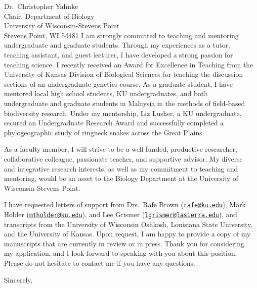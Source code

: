\documentclass[letterpaper, 10pt]{letter}
\begin{document}
\begin{letter}{Dr.\ Christopher Yahnke \\
                     Chair, Department of Biology \\
                     University of Wisconsin-Stevens Point \\
                     Stevens Point, WI  54481}
I am strongly committed to teaching and mentoring undergraduate and graduate students.
Through my experiences as a tutor, teaching assistant, and guest lecturer, I have developed a strong passion for teaching science.
I recently received an Award for Excellence in Teaching from the University of Kansas Division of Biological Sciences for teaching the discussion sections of an undergraduate genetics course.
As a graduate student, I have mentored local high school students, KU undergraduates, and both undergraduate and graduate students in Malaysia in the methods of field-based biodiversity research.
Under my mentorship, Liz Lusher, a KU undergraduate, secured an Undergraduate Research Award and successfully completed a phylogeographic study of ringneck snakes across the Great Plains.

As a faculty member, I will strive to be a well-funded, productive researcher, collaborative colleague, passionate teacher, and supportive advisor.
My diverse and integrative research interests, as well as my commitment to teaching and mentoring, would be an asset to the Biology Department at the University of Wisconsin-Stevens Point.

I have requested letters of support from Drs.\ Rafe Brown (\href{mailto:rafe@ku.edu}{\tt rafe@ku.edu}), Mark Holder (\href{mailto:mtholder@ku.edu}{\tt mtholder@ku.edu}), and Lee Grismer (\href{mailto:lgrismer@lasierra.edu}{\tt lgrismer@lasierra.edu}), and transcripts from the University of Wisconsin Oshkosh, Louisiana State University, and the University of Kansas.
Upon request, I am happy to provide a copy of my manuscripts that are currently in review or in press.
Thank you for considering my application, and I look forward to speaking with you about this position.
Please do not hesitate to contact me if you have any questions.

\addtolength{\medskipamount}{-5pt}
\closing{Sincerely,}
\end{letter}
\end{document}
